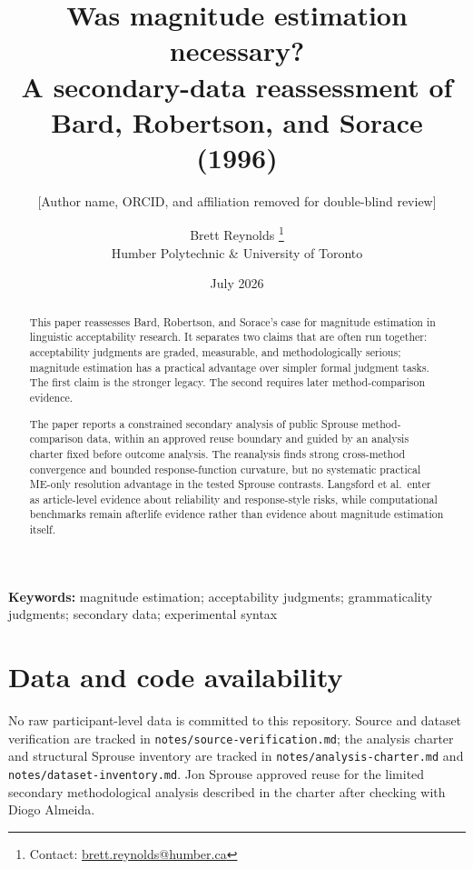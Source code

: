 \documentclass[12pt]{article}
\title{Was magnitude estimation necessary?\\
{\large A secondary-data reassessment of Bard, Robertson, and Sorace (1996)}}
\author{[Author name, ORCID, and affiliation removed for double-blind review]}
\author{Brett Reynolds \orcidlink{0000-0003-0073-7195}%
  \thanks{Contact: \href{mailto:brett.reynolds@humber.ca}{brett.reynolds@humber.ca}}\\
  Humber Polytechnic \& University of Toronto}
\date{July 2026}
\begin{document}
\maketitle

\begin{abstract}
This paper reassesses Bard, Robertson, and Sorace's case for magnitude
estimation in linguistic acceptability research. It separates two claims that
are often run together: acceptability judgments are graded, measurable, and
methodologically serious; magnitude estimation has a practical advantage over
simpler formal judgment tasks. The first claim is the stronger legacy. The
second requires later method-comparison evidence.

The paper reports a constrained secondary analysis of public Sprouse
method-comparison data, within an approved reuse boundary and guided by an
analysis charter fixed before outcome analysis. The reanalysis finds strong
cross-method convergence and bounded response-function curvature, but no
systematic practical ME-only resolution advantage in the tested Sprouse
contrasts. Langsford et al.\ enter as article-level evidence about reliability
and response-style risks, while computational benchmarks remain afterlife
evidence rather than evidence about magnitude estimation itself.
\end{abstract}

\noindent\textbf{Keywords:} magnitude estimation; acceptability judgments; grammaticality judgments; secondary data; experimental syntax









\section*{Data and code availability}

No raw participant-level data is committed to this repository. Source and
dataset verification are tracked in \texttt{notes/source-verification.md}; the
analysis charter and structural Sprouse inventory are tracked in
\texttt{notes/analysis-charter.md} and \texttt{notes/dataset-inventory.md}.
Jon Sprouse approved reuse for the limited secondary methodological analysis
described in the charter after checking with Diogo Almeida.
\end{document}
